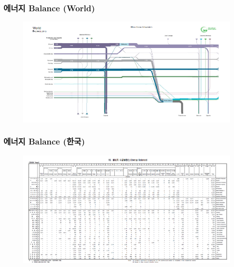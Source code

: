 \documentclass[10pt,compress,slidetop,%
			   hyperref={unicode},xcolor={svgnames},%
			   t]{beamer}
\begin{document}
%
\begin{frame}
	\frametitle{에너지 Balance (World)}
	  	\begin{figure}
	\centering
	 \includegraphics[width=1.1\textwidth]{WB.png}
	\label{IEA world balance}
	\end{figure}	
	
\end{frame}

%
\begin{frame}
	\frametitle{에너지 Balance (한국)}
	  	\begin{figure}
	\centering
	 \includegraphics[width=1.00\textwidth]{EBK.png}
	\label{IEA world balance}
	\end{figure}	
	
\end{frame}
\end{document}
